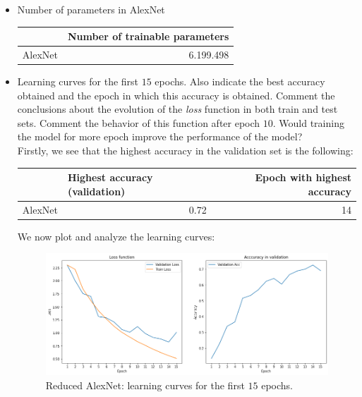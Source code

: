 \documentclass[a4paper]{article}
\def\inline{\lstinline[basicstyle=\ttfamily,keywordstyle={}]}
\begin{document}
\begin{itemize}
\begin{verbatim}
    def forward(self, x):
        x = self.features(x)
        interm_features = x.view(x.shape[0], -1)
        x = self.classifier(interm_features)
        return x, interm_features
        \end{verbatim}

        In this case, we are using \textbf{two sequential blocks} in order to simplify the code of the \inline{forward} method.
  \item Number of parameters in AlexNet
        \begin{table}[H]
          \centering
          \begin{tabular}{l|r}
                    & \multicolumn{1}{l}{Number of trainable parameters} \\ \hline
            AlexNet & 6.199.498
          \end{tabular}
        \end{table}
  \item Learning curves for the first \(15\) epochs. Also indicate the best accuracy obtained and the epoch in which this accuracy is obtained. Comment the conclusions about the evolution of the \emph{loss} function in both train and test sets. Comment the behavior of this function after epoch \(10\). Would training the model for more epoch improve the performance of the model? \\

        Firstly, we see that the highest accuracy in the validation set is the following:
        \begin{table}[H]
          \centering
          \begin{tabular}{l|rr}
                    & \multicolumn{1}{l}{Highest accuracy (validation)} & Epoch with highest accuracy \\ \hline
            AlexNet & 0.72                                              & 14
          \end{tabular}
        \end{table}
        We now plot and analyze the learning curves:
        \begin{figure}[H]
          \centering
          \includegraphics[scale = 0.5]{Figures/AlexNet-LearningCurves.png}
          \caption{Reduced AlexNet: learning curves for the first \(15\) epochs.}
        \end{figure}


\end{itemize}
\end{document}
